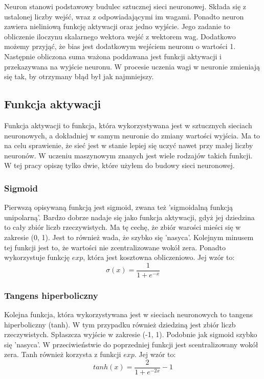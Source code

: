 \documentclass{report}
\begin{document}
    Neuron stanowi podstawowy budulec sztucznej sieci neuronowej.
    Składa się z ustalonej liczby wejść, wraz z odpowiadającymi im wagami.
    Ponadto neuron zawiera nieliniową funkcję aktywacji oraz jedno wyjście.
    Jego zadanie to obliczenie iloczynu skalarnego wektora wejść z wektorem wag.
    Dodatkowo możemy przyjąć, że bias jest dodatkowym wejściem neuronu o wartości 1.
    Następnie obliczona suma ważona poddawana jest funkcji aktywacji i przekazywana na wyjście neuronu.
    W procesie uczenia wagi w neuronie zmieniają się tak, by otrzymany błąd był jak najmniejszy.

    \subsection{Funkcja aktywacji}

    Funkcja aktywacji to funkcja, która wykorzystywana jest w sztucznych sieciach neuronowych, a dokładniej w samym neuronie do zmiany wartości wyjścia.
    Ma to na celu sprawienie, że sieć jest w stanie lepiej się uczyć nawet przy małej liczby neuronów.
    W uczeniu maszynowym znanych jest wiele rodzajów takich funkcji.
    W tej pracy opiszę tylko dwie, które użyłem do budowy sieci neuronowej.

    \subsubsection{Sigmoid}

    Pierwszą opisywaną funkcją jest sigmoid, zwana też 'sigmoidalną funkcją unipolarną'.
    Bardzo dobrze nadaje się jako funkcja aktywacji, gdyż jej dziedzina to cały zbiór liczb rzeczywistych.
    Ma tę cechę, że zbiór warości mieści się w zakresie (0, 1).
    Jest to również wada, że szybko się 'nasyca'.
    Kolejnym minusem tej funkcji jest to, że wartości nie zcentralizowane wokół zera.
    Ponadto wykorzystuje funkcję $exp$, która jest kosztowna obliczeniowo.
    Jej wzór to:
    $$
    \sigma(x) = \frac {1}{1+e^{-x}}
    $$


    \subsubsection{Tangens hiperboliczny}
    Kolejna funkcja, która wykorzystywana jest w sieciach neuronowych to tangens hiperboliczny (tanh).
    W tym przypadku również dziedziną jest zbiór liczb rzeczywistych.
    Spłaszcza wyjście w zakresie (-1, 1).
    Podobnie jak sigmoid szybko się 'nasyca'.
    W przeciwieństwie do poprzedniej funkcji jest scentralizowany wokół zera.
    Tanh również korzysta z funkcji $exp$.
    Jej wzór to:
    $$
    tanh(x) = \frac {2}{1+e^{-2x}} - 1
    $$
\end{document}
